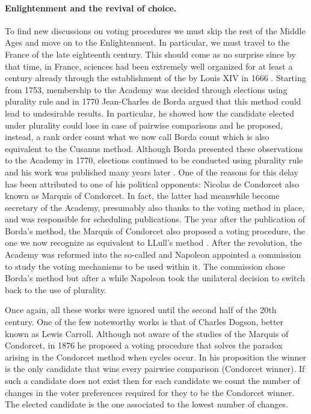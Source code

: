 \paragraph{Enlightenment and the revival of choice.}
To find new discussions on voting procedures we must skip the rest of the Middle Ages and move on to the Enlightenment. In particular, we must travel to the France of the late eighteenth century. This should come as no surprise since by that time, in France, sciences had been extremely well organized for at least a century already through the establishment of the  by Louis XIV in 1666 \citep{Demeulenaere1995}. Starting from 1753, membership to the Academy was decided through elections using plurality rule and in 1770 Jean-Charles de Borda argued that this method could lead to undesirable results. In particular, he showed how the candidate elected under plurality could lose in case of pairwise comparisons and he proposed, instead, a rank order count \textemdash what we now call Borda count which is also equivalent to the Cusanus method. Although Borda presented these observations to the Academy in 1770, elections continued to be conducted using plurality rule and his work was published many years later \citep{Borda1784}.
One of the reasons for this delay has been attributed to one of his political opponents: Nicolas de Condorcet \citep{Urken2004} \textemdash also known as Marquis of Condorcet. In fact, the latter had meanwhile become secretary of the Academy, presumably also thanks to the voting method in place, and was responsible for scheduling publications. %
The year after the publication of Borda's method, the Marquis of Condorcet also proposed a voting procedure, the one we now recognize as equivalent to LLull's method \citep{Condorcet1785}.
After the revolution, the Academy was reformed into the so-called  and Napoleon appointed a commission to study the voting mechanisms to be used within it. The commission chose Borda's method but after a while Napoleon took the unilateral decision to switch back to the use of plurality.

Once again, all these works were ignored until the second half of the 20th century. One of the few noteworthy works is that of Charles Dogson, better known as Lewis Carroll. Although not aware of the studies of the Marquis of Condorcet, in 1876 he proposed a voting procedure that solves the paradox arising in the Condorcet method when cycles occur.
In his proposition the winner is the only candidate that wins every pairwise comparison (Condorcet winner). If such a candidate does not exist then for each candidate we count the number of changes in the voter preferences required for they to be the Condorcet winner. The elected candidate is the one associated to the lowest number of changes.
